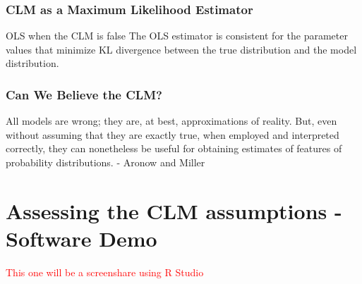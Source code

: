 \documentclass[12pt, block=fill]{beamer}
\newcommand{\paul}[1]{\textcolor{red}{#1}}
\begin{document}
\begin{frame}
  \frametitle{CLM as a Maximum Likelihood Estimator}
  \begin{block}{OLS when the CLM is false}
The OLS estimator is consistent for the parameter values that minimize KL divergence between the true distribution and the model distribution.
\end{block}
\end{frame}



\begin{frame}
  \frametitle{Can We Believe the CLM?}
  
  All models are wrong; they are, at best, approximations of reality. But, even without assuming that they are exactly true, when employed and interpreted correctly, they can nonetheless be useful for obtaining estimates of features of probability distributions.
  \flushright \footnotesize - Aronow and Miller

\end{frame}







\section{Assessing the CLM assumptions - Software Demo}


\begin{frame}
\paul{This one will be a screenshare using R Studio}
  
\end{frame}
\end{document}
